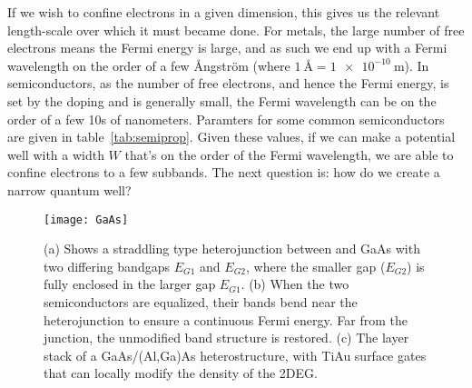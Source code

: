 If we wish to confine electrons in a given dimension, this gives us the relevant length-scale over which it must became
done. For metals, the large number of free electrons means the Fermi energy is large, and as such we end up with a
Fermi wavelength on the order of a few Ångström (where $\SI{1}{\angstrom} = \SI{1e-10}{\meter}$). In semiconductors, as
the number of free electrons, and hence the Fermi energy, is set by the doping and is generally small, the Fermi
wavelength can be on the order of a few 10s of nanometers. Paramters for some common semiconductors are given
in table~\ref{tab:semiprop}. Given these values, if we can make a potential well with a width $W$ that's on
the order of the Fermi wavelength, we are able to confine electrons to a few subbands. The next question is: how
do we create a narrow quantum well?

\begin{figure}
  \texttt{[image: GaAs]}
  \caption[Band bending in a straddling type heterojunction, and the GaAs/AlGaAs heterostructure]
  {\label{fig:heterostructure}(a) Shows a straddling type heterojunction between  and GaAs with two
  differing bandgaps $E_{G1}$ and $E_{G2}$, where the smaller gap ($E_{G2}$) is fully enclosed in the larger gap $E_{G1}$.
  (b) When the two semiconductors are equalized, their bands bend near the heterojunction to ensure a continuous Fermi
  energy. Far from the junction, the unmodified band structure is restored. (c) The layer stack of a GaAs/(Al,Ga)As heterostructure,
  with TiAu surface gates that can locally modify the density of the 2DEG.}

\end{figure}

